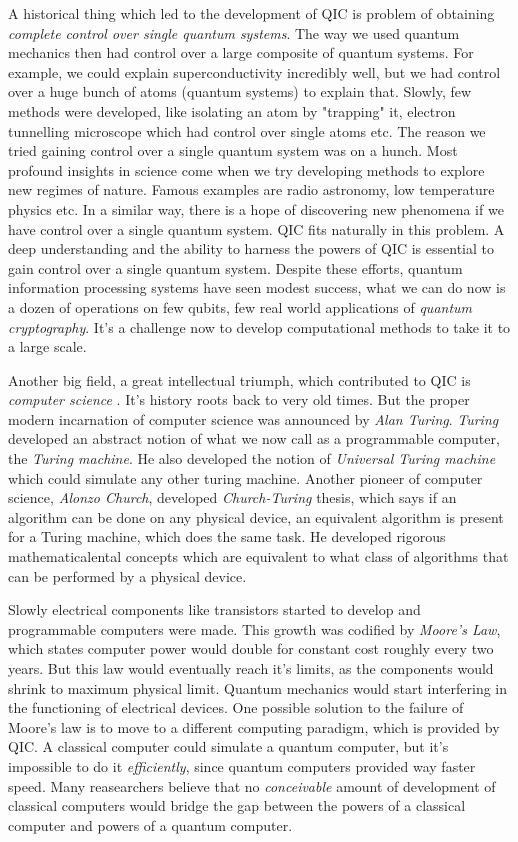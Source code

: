 A historical thing which led to the development of QIC is problem of obtaining \textit{complete control over single quantum systems}. The way we used quantum mechanics then had control over a large composite of quantum systems. For example, we could explain superconductivity incredibly well, but we had control over a huge bunch of atoms (quantum systems) to explain that. Slowly, few methods were developed, like isolating an atom by "trapping" it, electron tunnelling microscope which had control over single atoms etc. The reason we tried gaining control over a single quantum system was on a hunch. Most profound insights in science come when we try developing methods to explore new regimes of nature. Famous examples are radio astronomy, low temperature physics etc. In a similar way, there is a hope of discovering new phenomena if we have control over a single quantum system. QIC fits naturally in this problem. A deep understanding and the ability to harness the powers of QIC is essential to gain control over a single quantum system. Despite these efforts, quantum information processing systems have seen modest success, what we can do now is a dozen of operations on few qubits, few real world applications of \textit{quantum cryptography}. It's a challenge now to develop computational methods to take it to a large scale. 

Another big field, a great intellectual triumph, which contributed to QIC is \textit{computer science }. It's history roots back to very old times. But the proper modern incarnation of computer science was announced by \textit{Alan Turing}. \textit{Turing} developed an abstract notion of what we now call as a programmable computer, the \textit{Turing machine}. He also developed the notion of \textit{Universal Turing machine} which could simulate any other turing machine. Another pioneer of computer science, \textit{Alonzo Church}, developed \textit{Church-Turing} thesis, which says if an algorithm can be done on any physical device, an equivalent algorithm is present for a Turing machine, which does the same task. He developed rigorous mathematicalental concepts which are equivalent to what class of algorithms that can be performed by a physical device.

Slowly electrical components like transistors started to develop and programmable computers were made. This growth was codified by \textit{Moore's Law}, which states computer power would double for constant cost roughly every two years. But this law would eventually reach it's limits, as the components would shrink to maximum physical limit. Quantum mechanics would start interfering in the functioning of electrical devices. One possible solution to the failure of Moore's law is to move to a different computing paradigm, which is provided by QIC. A classical computer could simulate a quantum computer, but it's impossible to do it \textit{efficiently}, since quantum computers provided way faster speed. Many reasearchers believe that no \textit{conceivable} amount of development of classical computers would bridge the gap between the powers of a classical computer and powers of a quantum computer.

